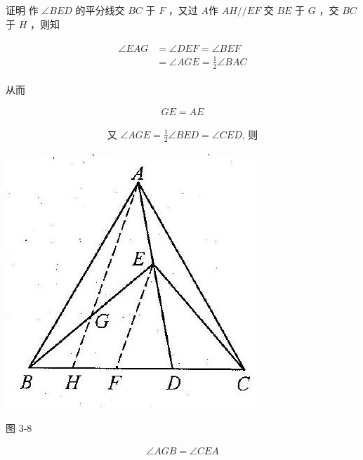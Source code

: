 \documentclass[10pt]{article}
\begin{document}
证明 作 $\angle B E D$ 的平分线交 $B C$ 于 $F$ ，又过 $A$作 $A H / / E F$ 交 $B E$ 于 $G$ ，交 $B C$ 于 $H$ ，则知

\begin{align*}
\begin{aligned}
\angle E A G & =\angle D E F=\angle B E F \\
& =\angle A G E=\frac{1}{2} \angle B A C
\end{aligned}
\end{align*}

从而

\begin{align*}
G E=A E
\end{align*}

\begin{align*}
\text { 又 } \angle A G E=\frac{1}{2} \angle B E D=\angle C E D \text {, 则 }
\end{align*}

\begin{center}
\includegraphics[max width=\textwidth]{2024_10_30_2c8f45efd4a519b08e1ag-027(1)}
\end{center}

图 3-8

\begin{align*}
\angle A G B=\angle C E A
\end{align*}
\end{document}
